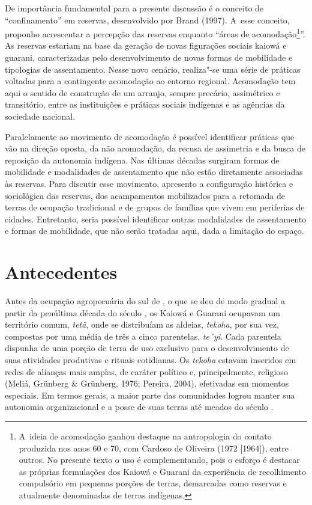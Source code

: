 De importância fundamental para a presente discussão é o conceito de
``confinamento'' em reservas, desenvolvido por Brand (1997). A~esse
conceito, proponho acrescentar a percepção das reservas enquanto ``áreas
de acomodação\footnote{A~ideia de acomodação ganhou destaque na
antropologia do contato produzida nos anos 60 e 70, com Cardoso de
Oliveira (1972 [1964]), entre outros. No presente texto o uso é
complementando, pois o esforço é destacar as próprias formulações dos
Kaiowá e Guarani da experiência de recolhimento compulsório em pequenas
porções de terras, demarcadas como reservas e atualmente denominadas de
terras indígenas. }''. As reservas estariam na base da geração de novas
figurações sociais kaiowá e guarani, caracterizadas pelo
desenvolvimento de novas formas de mobilidade e tipologias de
assentamento. Nesse novo cenário, realiza"-se uma série de práticas
voltadas para a contingente acomodação ao entorno regional. Acomodação
tem aqui o sentido de construção de um arranjo, sempre precário,
assimétrico e transitório, entre as instituições e práticas sociais
indígenas e as agências da sociedade nacional.

Paralelamente ao movimento de acomodação é possível identificar práticas
que vão na direção oposta, da não acomodação, da recusa de assimetria e
da busca de reposição da autonomia indígena. Nas últimas décadas
surgiram formas de mobilidade e modalidades de assentamento que não
estão diretamente associadas às reservas. Para discutir esse movimento,
apresento a configuração histórica e sociológica das reservas, dos
acampamentos mobilizados para a retomada de terras de ocupação
tradicional e de grupos de famílias que vivem em periferias de cidades.
Entretanto, seria possível identificar outras modalidades de
assentamento e formas de mobilidade, que não serão tratadas aqui, dada
a limitação do espaço. 

\section{Antecedentes}

Antes da ocupação agropecuária do sul de , o que se deu de modo
gradual a partir da penúltima década do século , os Kaiowá e Guarani
ocupavam um território comum, \emph{tetã}, onde se distribuíam as aldeias,
\emph{tekoha}, por sua vez, compostas por uma média de três a cinco
parentelas, \emph{te´yi}. Cada parentela dispunha de uma porção de terra de
uso exclusivo para o desenvolvimento de suas atividades produtivas e
rituais cotidianas. Os \emph{tekoha} estavam inseridos em redes de alianças
mais amplas, de caráter político e, principalmente, religioso (Meliá,
Grünberg \& Grünberg, 1976; Pereira, 2004), efetivadas em momentos
especiais. Em termos gerais, a maior parte das comunidades logrou
manter sua autonomia organizacional e a posse de suas terras até meados
do século .

